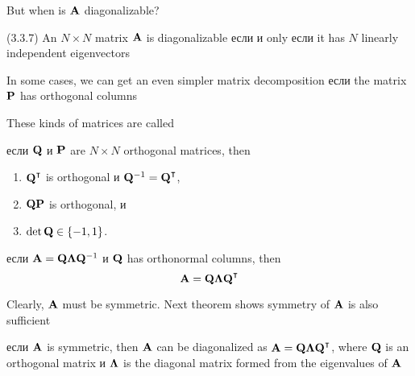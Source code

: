 \begin{frame}
    
    \vspace{2em}
    But when is $\mathbf A$ diagonalizable?  
    
    \vspace{.7em}
    \Fact (3.3.7)
    An $N \times N$ matrix $\mathbf A$ is diagonalizable если и only если
    it has $N$ linearly independent eigenvectors

\end{frame}


\begin{frame}

     \vspace{2em}
    In some cases, we can get an even simpler matrix decomposition если 
    the matrix $\mathbf P$ has orthogonal columns 

    These kinds of matrices are called 
    
    \vspace{.7em}
    \Fact{\eqref{ET-fa:orthmat}}
    если $\mathbf Q$ и $\mathbf P$ are $N \times N$ orthogonal matrices, then
    \begin{enumerate}
        \item $\boldQ^\T$ is orthogonal и $\boldQ^{-1} = \boldQ^\T$,
        \item $\mathbf Q \mathbf P$ is orthogonal, и
        \item $\det \mathbf Q \in \{-1, 1\}$.
    \end{enumerate}
    
\end{frame}
    
\begin{frame}

    \vspace{2em}
    если $\mathbf A = \mathbf Q {\boldsymbol \Lambda} \mathbf Q^{-1}$ и $\mathbf Q$ has orthonormal columns,
    then $$\boldA = \boldQ \boldLambda \boldQ^\T$$
    
    Clearly, $\mathbf A$ must be symmetric. Next theorem shows symmetry of $\mathbf A$ is also sufficient
    
    \vspace{.7em}
    \Thm{\eqref{ET-t:dismat}}
    если $\mathbf A$ is symmetric, then $\mathbf A$ can be
    diagonalized as $\boldA = \boldQ \boldLambda \boldQ^\T$, where 
    $\mathbf Q$ is an orthogonal matrix и ${\boldsymbol \Lambda}$ is the 
    diagonal matrix formed from the eigenvalues of $\mathbf A$
    
\end{frame}

